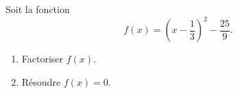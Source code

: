 
\begin{exercice}\label{exosmath-0318}

Soit la fonction
\begin{equation}
    f(x)=\left( x-\frac{1}{ 3 } \right)^2-\frac{ 25 }{ 9 }.
\end{equation}
\begin{enumerate}
    \item
        Factoriser \( f(x)\).
    \item
        Résoudre \( f(x)=0\).
\end{enumerate}


\end{exercice}
